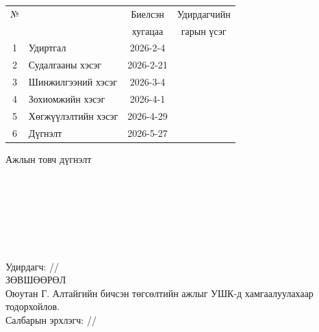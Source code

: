 \begin{titlepage}
\begin{center}
\begin{tabular}{|c|p{7cm}|c|c|}
	\hline
	№ & \makebox[7cm][c]{Хийж гүйцэтгэсэн ажил} & Биелсэн     & Удирдагчийн \\
	  &                    & хугацаа    & гарын үсэг \\ \hline
	1 & {Удиртгал}         & 2026-2-4 &  \\ \hline
	2 & {Судалгааны хэсэг}     & 2026-2-21 &  \\ \hline
	3 & {Шинжилгээний хэсэг} & 2026-3-4 &  \\ \hline
	4 & {Зохиомжийн хэсэг}    & 2026-4-1 &  \\ \hline
	5 & {Хөгжүүлэлтийн хэсэг}          & 2026-4-29 &  \\ \hline
        6 & {Дүгнэлт}          & 2026-5-27 &  \\ \hline
\end{tabular}

\vspace{1cm}
Ажлын товч дүгнэлт \\[0.5cm]
\dotfill \\[0.2cm]
\dotfill \\[0.2cm]
\dotfill \\[0.2cm]
\dotfill \\[0.2cm]
\dotfill \\[0.2cm]
\dotfill \\[0.2cm]
\dotfill \\[0.5cm]
Удирдагч: \makebox[3cm]{\dotfill} /\supname/ \\

\vspace{2cm}
ЗӨВШӨӨРӨЛ \\[0.5cm]
Оюутан Г. Алтайгийн бичсэн төгсөлтийн ажлыг УШК-д хамгаалуулахаар тодорхойлов.\\[0.5cm]
Салбарын эрхлэгч: \makebox[3cm]{\dotfill} /\chairname/
\end{center}

\end{titlepage}

\newpage

